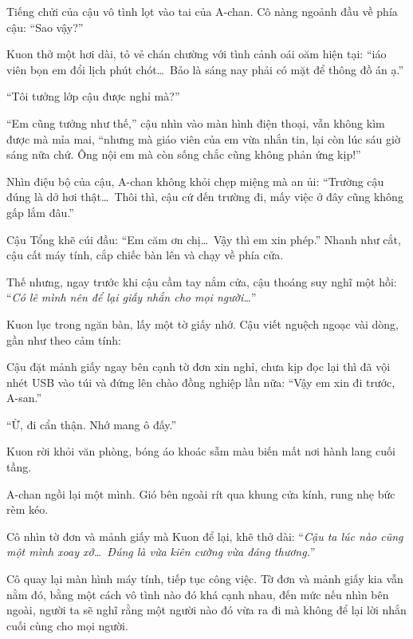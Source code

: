 \documentclass[../main.tex]{subfiles}
\begin{document}
Tiếng chửi của cậu vô tình lọt vào tai của A-chan. Cô nàng ngoảnh đầu về phía cậu: ``Sao vậy?''

Kuon thở một hơi dài, tỏ vẻ chán chường với tình cảnh oái oăm hiện tại: ``iáo viên bọn em đổi lịch phút chót\dots\ Bảo là sáng nay phải có mặt để thông đồ án ạ.''

``Tôi tưởng lớp cậu được nghỉ mà?''

``Em cũng tưởng như thế,'' cậu nhìn vào màn hình điện thoại, vẫn không kìm được mà mỉa mai, ``nhưng mà giáo viên của em vừa nhắn tin, lại còn lúc sáu giờ sáng nữa chứ. Ông nội em mà còn sống chắc cũng không phản ứng kịp!''

Nhìn điệu bộ của cậu, A-chan không khỏi chẹp miệng mà an ủi: ``Trường cậu đúng là dở hơi thật\dots\ Thôi thì, cậu cứ đến trường đi, mấy việc ở đây cũng không gấp lắm đâu.''

Cậu Tổng khẽ cúi đầu: ``Em căm ơn chị\dots\ Vậy thì em xin phép.'' Nhanh như cắt, cậu cất máy tính, cắp chiếc bàn lên và chạy về phía cửa.

Thế nhưng, ngay trước khi cậu cầm tay nắm cửa, cậu thoáng suy nghĩ một hồi: ``\textit{Có lẽ mình nên để lại giấy nhắn cho mọi người\dots}''

Kuon lục trong ngăn bàn, lấy một tờ giấy nhớ. Cậu viết nguệch ngoạc vài dòng, gần như theo cảm tính:


Cậu đặt mảnh giấy ngay bên cạnh tờ đơn xin nghỉ, chưa kịp đọc lại thì đã vội nhét USB vào túi và đứng lên chào đồng nghiệp lần nữa: ``Vậy em xin đi trước, A-san.''

``Ừ, đi cẩn thận. Nhớ mang ô đấy.''

Kuon rời khỏi văn phòng, bóng áo khoác sẫm màu biến mất nơi hành lang cuối tầng.

A-chan ngồi lại một mình. Gió bên ngoài rít qua khung cửa kính, rung nhẹ bức rèm kéo.

Cô nhìn tờ đơn và mảnh giấy mà Kuon để lại, khẽ thở dài: ``\textit{Cậu ta lúc nào cũng một mình xoay xở\dots\ Đúng là vừa kiên cường vừa đáng thương.}''

Cô quay lại màn hình máy tính, tiếp tục công việc. Tờ đơn và mảnh giấy kia vẫn nằm đó, bằng một cách vô tình nào đó khá cạnh nhau, đến mức nếu nhìn bên ngoài, người ta sẽ nghĩ rằng một người nào đó vừa ra đi mà không để lại lời nhắn cuối cùng cho mọi người.
\end{document}

